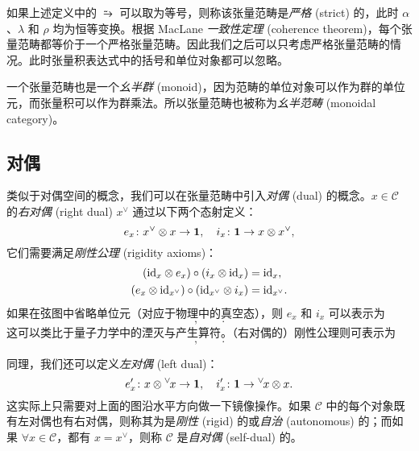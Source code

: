 如果上述定义中的 $\similarrightarrow$ 可以取为等号，则称该张量范畴是\emph{严格} (strict) 的，此时 $\alpha$、$\lambda$ 和 $\rho$ 均为恒等变换。根据 MacLane \emph{一致性定理} (coherence theorem)，每个张量范畴都等价于一个严格张量范畴。因此我们之后可以只考虑严格张量范畴的情况。此时张量积表达式中的括号和单位对象都可以忽略。

一个张量范畴也是一个\emph{幺半群} (monoid)，因为范畴的单位对象可以作为群的单位元，而张量积可以作为群乘法。所以张量范畴也被称为\emph{幺半范畴} (monoidal category)。

\subsection{对偶}

类似于对偶空间的概念，我们可以在张量范畴中引入\emph{对偶} (dual) 的概念。$x\in\mathcal{C}$ 的\emph{右对偶} (right dual) $x^\vee$ 通过以下两个态射定义：
\begin{equation}
  e_x\colon x^\vee\otimes x\to\mathbf{1}, \quad i_x\colon\mathbf{1}\to x\otimes x^\vee,
\end{equation}
它们需要满足\emph{刚性公理} (rigidity axioms)：
\begin{equation}
  \begin{aligned}
    (\mathrm{id}_x\otimes e_x) \circ (i_x\otimes\mathrm{id}_x) &= \mathrm{id}_x, \\
    (e_x\otimes\mathrm{id}_{x^\vee}) \circ (\mathrm{id}_{x^\vee}\otimes i_x) &= \mathrm{id}_{x^\vee}.
  \end{aligned}
\end{equation}
如果在弦图中省略单位元（对应于物理中的真空态），则 $e_x$ 和 $i_x$ 可以表示为
\begin{equation}
  ,
  \qquad
  .
\end{equation}
这可以类比于量子力学中的湮灭与产生算符。（右对偶的）刚性公理则可表示为
\begin{equation}
  ,
  \qquad
  .
\end{equation}

同理，我们还可以定义\emph{左对偶} (left dual)：
\begin{equation}
  e'_x \colon x\otimes {}^\vee\mspace{-2mu}x\to\mathbf{1}, \quad i'_x\colon \mathbf{1}\to{}^\vee\mspace{-2mu}x\otimes x.
  \label{eq:left-dual}
\end{equation}
这实际上只需要对上面的图沿水平方向做一下镜像操作。如果 $\mathcal{C}$ 中的每个对象既有左对偶也有右对偶，则称其为是\emph{刚性} (rigid) 的或\emph{自治} (autonomous) 的；而如果 $\forall x\in\mathcal{C}$，都有 $x=x^\vee$，则称 $\mathcal{C}$ 是\emph{自对偶} (self-dual) 的。

